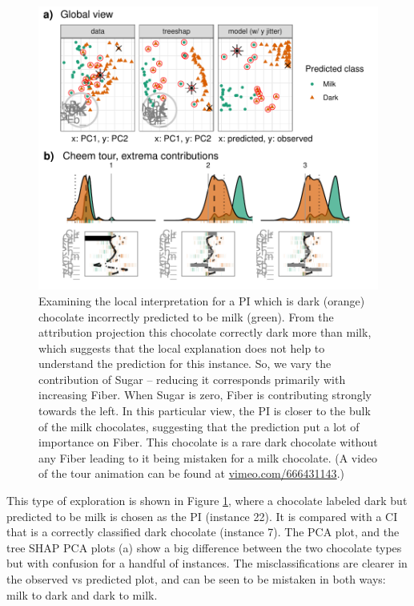 \documentclass[
]{article}
\begin{document}
\begin{figure}

{\centering \includegraphics[width=1\linewidth]{./figures/case_chocolates} 

}

\caption{Examining the local interpretation for a PI which is dark (orange) chocolate incorrectly predicted to be milk (green). From the attribution projection this chocolate correctly dark more than milk, which suggests that the local explanation does not help to understand the prediction for this instance. So, we vary the contribution of Sugar -- reducing it corresponds primarily with increasing Fiber. When Sugar is zero, Fiber is contributing strongly towards the left. In this particular view, the PI is closer to the bulk of the milk chocolates, suggesting that the prediction put a lot of importance on Fiber. This chocolate is a rare dark chocolate without any Fiber leading to it being mistaken for a milk chocolate. (A video of the tour animation can be found at \href{https://vimeo.com/666431143}{vimeo.com/666431143}.)}\label{fig:casechocolates}
\end{figure}

This type of exploration is shown in Figure \ref{fig:casechocolates}, where a chocolate labeled dark but predicted to be milk is chosen as the PI (instance 22). It is compared with a CI that is a correctly classified dark chocolate (instance 7). The PCA plot, and the tree SHAP PCA plots (a) show a big difference between the two chocolate types but with confusion for a handful of instances. The misclassifications are clearer in the observed vs predicted plot, and can be seen to be mistaken in both ways: milk to dark and dark to milk.
\end{document}
